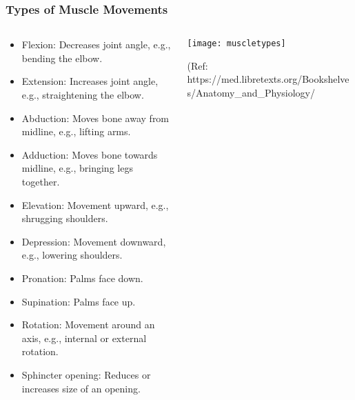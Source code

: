 \begin{frame}[fragile]\frametitle{Types of Muscle Movements}
\begin{columns}
    \begin{column}[T]{0.5\linewidth}
      \begin{itemize}
		\item Flexion: Decreases joint angle, e.g., bending the elbow.
		\item Extension: Increases joint angle, e.g., straightening the elbow.
		\item Abduction: Moves bone away from midline, e.g., lifting arms.
		\item Adduction: Moves bone towards midline, e.g., bringing legs together.
		\item Elevation: Movement upward, e.g., shrugging shoulders.
		\item Depression: Movement downward, e.g., lowering shoulders.
		\item Pronation: Palms face down.
		\item Supination: Palms face up.
		\item Rotation: Movement around an axis, e.g., internal or external rotation.
		\item Sphincter opening: Reduces or increases size of an opening.
	  \end{itemize}
    \end{column}
    \begin{column}[T]{0.5\linewidth}
		\begin{center}
		\texttt{[image: muscletypes]}
				
		{\tiny (Ref: https://med.libretexts.org/Bookshelves/Anatomy\_and\_Physiology/}		
		\end{center}	
    \end{column}
  \end{columns}
\end{frame}

